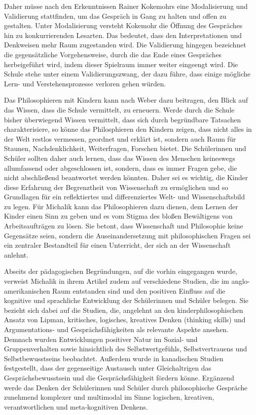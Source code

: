 Daher müsse nach den Erkenntnissen Rainer Kokemohrs eine Modalisierung und Validierung stattfinden, um das Gespräch in Gang zu halten und offen zu gestalten.
Unter Modalisierung versteht Kokemohr \glqq die Öffnung des Gespräches hin zu konkurrierenden Lesarten.\grqq{}\cite[S.\,637]{KM13}
Das bedeutet, dass den Interpretationen und Denkweisen mehr Raum zugestanden wird.
Die Validierung hingegen bezeichnet die gegensätzliche Vorgehensweise, durch die das Ende eines Gespräches herbeigeführt wird, indem dieser Spielraum immer weiter eingeengt wird.
Die Schule stehe unter einem Validierungszwang, der dazu führe, dass einige mögliche Lern- und Verstehensprozesse verloren gehen würden.
 
Das Philosophieren mit Kindern kann nach Weber dazu beitragen, den Blick auf das Wissen, dass die Schule vermittelt, zu erneuern.
Werde durch die Schule bisher überwiegend Wissen vermittelt, dass sich durch begründbare Tatsachen charakterisiere, so könne das Philosphieren den Kindern zeigen, dass nicht alles in der Welt \glqq restlos vermessen, geordnet und erklärt ist, sondern auch Raum für Staunen, Nachdenklichkeit, Weiterfragen, Forschen bietet.\grqq{}\cite[S.\,639]{KM13}
Die Schülerinnen und Schüler sollten daher auch lernen, dass das Wissen des Menschen keineswegs allumfassend oder abgeschlossen ist, sondern, dass es immer Fragen gebe, die nicht abschließend beantwortet werden könnten.
Daher sei es wichtig, die Kinder diese Erfahrung der Begrenztheit von Wissenschaft zu ermöglichen und so \glqq Grundlagen für ein reflektiertes und differenziertes Welt- und Wissenschaftsbild zu legen.\grqq{}\cite[S.\,640]{KM13}
Für Michalik kann das Philosophieren dazu dienen, dem Lernen der Kinder einen Sinn zu geben und es vom Stigma des bloßen Bewältigens von Arbeitsaufträgen zu lösen.
Sie betont, dass Wissenschaft und Philosophie keine Gegensätze seien, sondern die Auseinandersetzung mit philosophischen Fragen sei ein zentraler Bestandteil für einen Unterricht, der sich an der Wissenschaft anlehnt.
  
Abseits der pädagogischen Begründungen, auf die vorhin eingegangen wurde, verweist Michalik in ihrem Artikel zudem auf verschiedene Studien, die im anglo-amerikanischen Raum entstanden sind und den positiven Einfluss auf die kognitive und sprachliche Entwicklung der Schülerinnen und Schüler belegen. 
Sie bezieht sich dabei auf die Studien, die, angelehnt an den kinderphilosophischen Ansatz von Lipman, \glqq kritisches, logisches, kreatives Denken (thinking skills) und Argumentations- und Gesprächsfähigkeiten\grqq{}\cite[S.\,643]{KM13} als relevante Aspekte ansehen. 
Demnach wurden Entwicklungen positiver Natur im Sozial- und Gruppenverhalten sowie hinsichtlich des Selbstwertgefühls, Selbstvertrauens und Selbstbewusstseins beobachtet.
Außerdem wurde in kanadischen Studien festgestellt, dass der gegenseitige Austausch unter Gleichaltrigen das Gesprächsbewusstsein und die Gesprächsfähigkeit fördern könne. 
Ergänzend werde das Denken der Schülerinnen und Schüler durch philosophische Gespräche \glqq zunehmend komplexer und multimodal im Sinne logischen, kreativen, verantwortlichen und meta-kognitiven Denkens.\grqq{}\cite[S.\,643]{KM13}

